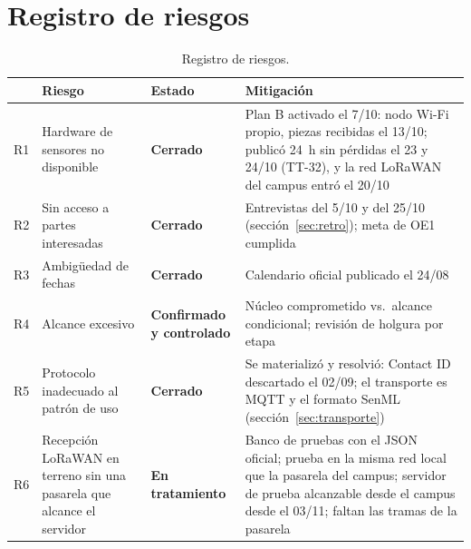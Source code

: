 \section*{Registro de riesgos}

\begin{table}[H]
\centering\small
\begin{tabular}{@{}lL{3.8cm}L{2.2cm}L{5.0cm}@{}}
\toprule
 & \textbf{Riesgo} & \textbf{Estado} & \textbf{Mitigación} \\
\midrule
R1 & Hardware de sensores no disponible & \textbf{Cerrado} & Plan B activado el 7/10: nodo Wi-Fi propio, piezas recibidas el 13/10; publicó 24~h sin pérdidas el 23 y 24/10 (TT-32), y la red LoRaWAN del campus entró el 20/10 \\
R2 & Sin acceso a partes interesadas & \textbf{Cerrado} & Entrevistas del 5/10 y del 25/10 (sección~\ref{sec:retro}); meta de OE1 cumplida \\
R3 & Ambigüedad de fechas & \textbf{Cerrado} & Calendario oficial publicado el 24/08 \\
R4 & Alcance excesivo & \textbf{Confirmado y controlado} & Núcleo comprometido vs.\ alcance condicional; revisión de holgura por etapa \\
R5 & Protocolo inadecuado al patrón de uso & \textbf{Cerrado} & Se materializó y resolvió: Contact ID descartado el 02/09; el transporte es MQTT y el formato SenML (sección~\ref{sec:transporte}) \\
R6 & Recepción LoRaWAN en terreno sin una pasarela que alcance el servidor & \textbf{En tratamiento} & Banco de pruebas con el JSON oficial; prueba en la misma red local que la pasarela del campus; servidor de prueba alcanzable desde el campus desde el 03/11; faltan las tramas de la pasarela \\
\bottomrule
\end{tabular}
\caption{Registro de riesgos.}
\label{tab:riesgos}
\end{table}
